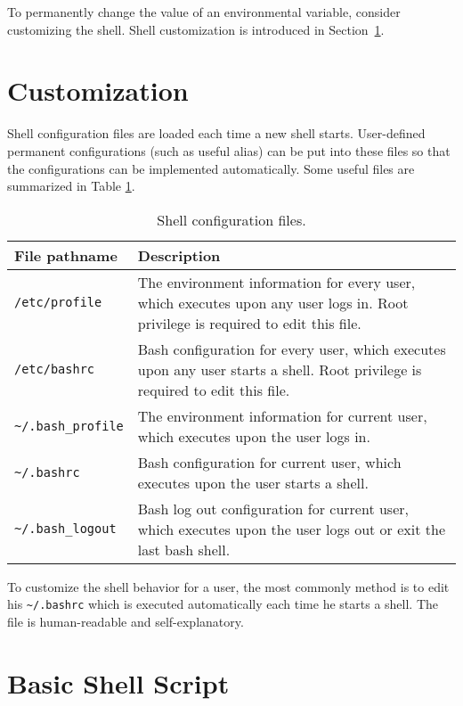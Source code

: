 To permanently change the value of an environmental variable, consider customizing the shell. Shell customization is introduced in Section~\ref{ch:sb:subsec:customizeshell}.

\section{Customization} \label{ch:sb:subsec:customizeshell}

Shell configuration files are loaded each time a new shell starts. User-defined permanent configurations (such as useful alias) can be put into these files so that the configurations can be implemented automatically. Some useful files are summarized in Table \ref{ch:sb:tab:shellconfig}.

\begin{table}[!htb]
	\centering \caption{Shell configuration files.}\label{ch:sb:tab:shellconfig}
	\begin{tabularx}{\textwidth}{lX}
		\hline
		File pathname & Description \\ \hline
		\verb|/etc/profile| & The environment information for every user, which executes upon any user logs in. Root privilege is required to edit this file.  \\ 
		\verb|/etc/bashrc| & Bash configuration for every user, which executes upon any user starts a shell. Root privilege is required to edit this file. \\ 
		\verb|~/.bash_profile| & The environment information for current user, which executes upon the user logs in. \\ 
		\verb|~/.bashrc| & Bash configuration for current user, which executes upon the user starts a shell. \\ 
		\verb|~/.bash_logout| & Bash log out configuration for current user, which executes upon the user logs out or exit the last bash shell. \\ \hline
	\end{tabularx}
\end{table}

To customize the shell behavior for a user, the most commonly method is to edit his \verb|~/.bashrc| which is executed automatically each time he starts a shell. The file is human-readable and self-explanatory.

\section{Basic Shell Script}


